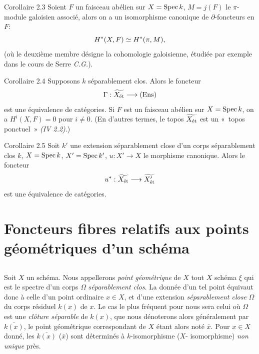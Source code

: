\documentclass[10pt]{../fichiers-configuration-latex/smfart}
\begin{document}
\begin{enonce*}{Corollaire 2.3}
Soient $F$ un faisceau abélien sur $X = \operatorname{Spec} k$, $M = j(F)$ le
$\pi$-module galoisien associé, alors on a un isomorphisme canonique
de $\partial$-foncteurs en $F$:
$$
H^{\ast} (X, F) \simeq H^{\ast} (\pi, M){},
$$
(où le deuxième membre désigne la cohomologie galoisienne,
étudiée par
exemple dans le cours de Serre \emph{C.G.}).
\end{enonce*}

\begin{enonce*}{Corollaire 2.4}
Supposons $k$ séparablement clos. Alors le foncteur
$$
\Gamma : \widetilde{X_{\text{\rm ét}}} \to (\Ens)
$$
est une équivalence de catégories. Si $F$ est un faisceau abélien sur
$X = \operatorname{Spec} k$, on a $H^{i}(X, F) = 0$ pour $i \neq 0$. (En d'autres
termes, le topos $\widetilde{X_{\text{\rm ét}}}$ est un « topos
ponctuel » \emph{(IV 2.2)}.)
\end{enonce*}

\begin{enonce*}{Corollaire 2.5}
Soit $k'$ une extension séparablement close d'un corps séparablement
clos $k$, $X = \operatorname{Spec} k$, $X' = \operatorname{Spec} k'$, $u : X'\to X$ le morphisme
canonique. Alors le foncteur
$$
u^{\ast} : \widetilde{X_{\text{\rm ét}}} \to \widetilde{X'_{\text{\rm ét}}}
$$
est une équivalence de catégories.
\end{enonce*}

\section{Foncteurs fibres relatifs aux points géométriques d'un
  schéma}\pageoriginale

\subsection{}

Soit $X$ un schéma. Nous appellerons \emph{point géométrique} de $X$
tout $X$ schéma $\xi$ qui est le spectre d'un corps $\Omega$
\emph{séparablement clos}. La donnée d'un tel point équivaut donc à
celle d'un point ordinaire $x \in X$, et d'une extension
\emph{séparablement close} $\Omega$ du corps résiduel $k(x)$ de $x$.
Le cas le plus fréquent pour nous sera celui où $\Omega$ est une
\emph{clôture séparable} de $k(x)$, que nous dénoterons alors
généralement par $\bar{k(x)}$, le point géométrique correspondant de
$X$ étant alors noté $\bar{x}$. Pour $x \in X$ donné, les
$\bar{k(x)}$ (\resp $\bar{x}$) sont déterminés à $k$-isomorphisme
(\resp $X$- isomorphisme) \emph{non unique} près.
\end{document}
